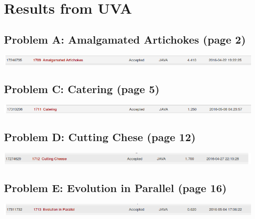 \documentclass[12pt]{article}
\begin{document}

\newcommand{\hmwkClass}{COS 255}
\newcommand{\hmwkSemester}{Spring 2016}

\newcommand{\hmwkAuthorName}{Lukas Leung}
\newcommand{\hmwkAuthorID}{lleung}

\newcommand{\hmwkAssignmentNum}{9}

\newcommand{\hmwkProblemNum}{0}

\newcommand{\hmwkCollaborators}{}
\thispagestyle{fancycollab}

\section*{Results from UVA}
\subsection{Problem A: Amalgamated Artichokes (page 2)}
\includegraphics[width=\textwidth]{ProblemA}
\subsection{Problem C: Catering (page 5)}
\includegraphics[width=\textwidth]{ProblemC}
\subsection{Problem D: Cutting Chese (page 12)}
\includegraphics[width=\textwidth]{ProblemD}
\subsection{Problem E: Evolution in Parallel (page 16)}
\includegraphics[width=\textwidth]{ProblemE}
\end{document}
